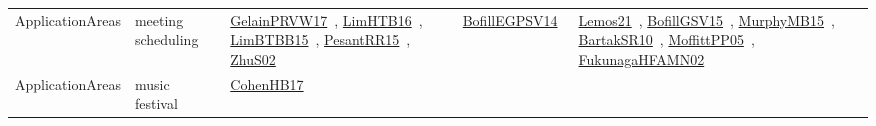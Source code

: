 {\begin{longtable}{lp{3cm}>{\raggedright\arraybackslash}p{6cm}>{\raggedright\arraybackslash}p{6cm}>{\raggedright\arraybackslash}p{8cm}}
ApplicationAreas & meeting scheduling & \href{../works/GelainPRVW17.pdf}{GelainPRVW17}~\cite{GelainPRVW17}, \href{../works/LimHTB16.pdf}{LimHTB16}~\cite{LimHTB16}, \href{../works/LimBTBB15.pdf}{LimBTBB15}~\cite{LimBTBB15}, \href{../works/PesantRR15.pdf}{PesantRR15}~\cite{PesantRR15}, \href{../works/ZhuS02.pdf}{ZhuS02}~\cite{ZhuS02} & \href{../works/BofillEGPSV14.pdf}{BofillEGPSV14}~\cite{BofillEGPSV14} & \href{../works/Lemos21.pdf}{Lemos21}~\cite{Lemos21}, \href{../works/BofillGSV15.pdf}{BofillGSV15}~\cite{BofillGSV15}, \href{../works/MurphyMB15.pdf}{MurphyMB15}~\cite{MurphyMB15}, \href{../works/BartakSR10.pdf}{BartakSR10}~\cite{BartakSR10}, \href{../works/MoffittPP05.pdf}{MoffittPP05}~\cite{MoffittPP05}, \href{../works/FukunagaHFAMN02.pdf}{FukunagaHFAMN02}~\cite{FukunagaHFAMN02}\\
ApplicationAreas & music festival & \href{../works/CohenHB17.pdf}{CohenHB17}~\cite{CohenHB17} &  & \\

\end{longtable}}
